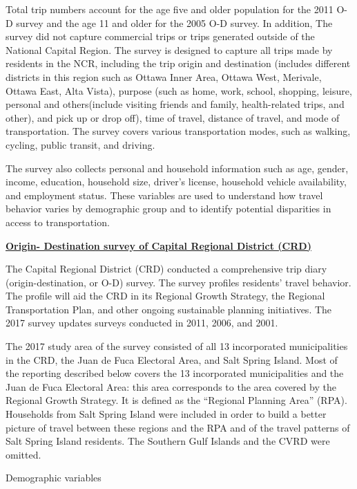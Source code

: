 \documentclass[
11pt, %
oneside, %
english, %
singlespacing, %
]{macthesis} %
\begin{document}
Total trip numbers account for the age five and older population for the 2011 O-D survey and the age 11 and older for the 2005 O-D survey. In addition, The survey did not capture commercial trips or trips generated outside of the National Capital Region. The survey is designed to capture all trips made by residents in the NCR, including the trip origin and destination (includes different districts in this region such as Ottawa Inner Area, Ottawa West, Merivale, Ottawa East, Alta Vista), purpose (such as home, work, school, shopping, leisure, personal and others(include visiting friends and family, health-related trips, and other), and pick up or drop off), time of travel, distance of travel, and mode of transportation. The survey covers various transportation modes, such as walking, cycling, public transit, and driving.

The survey also collects personal and household information such as age, gender, income, education, household size, driver's license, household vehicle availability, and employment status. These variables are used to understand how travel behavior varies by demographic group and to identify potential disparities in access to transportation.

\textbf{\href{https://www.crd.bc.ca/project/regional-transportation/origin-destination-household-travel}{Origin- Destination survey of Capital Regional District (CRD)}}

The Capital Regional District (CRD) conducted a comprehensive trip diary (origin-destination, or O-D) survey. The survey profiles residents' travel behavior. The profile will aid the CRD in its Regional Growth Strategy, the Regional Transportation Plan, and other ongoing sustainable planning initiatives. The 2017 survey updates surveys conducted in 2011, 2006, and 2001.

The 2017 study area of the survey consisted of all 13 incorporated municipalities in the CRD, the Juan de Fuca Electoral Area, and Salt Spring Island. Most of the reporting described below covers the 13 incorporated municipalities and the Juan de Fuca Electoral Area: this area corresponds to the area covered by the Regional Growth Strategy. It is defined as the ``Regional Planning Area'' (RPA). Households from Salt Spring Island were included in order to build a better picture of travel between these regions and the RPA and of the travel patterns of Salt Spring Island residents. The Southern Gulf Islands and the CVRD were omitted.

Demographic variables
\end{document}
